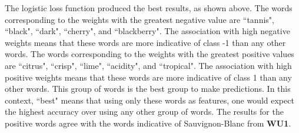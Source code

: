 \documentclass{article}
\begin{document}
\begin{enumerate}
\begin{enumerate}
	\end{enumerate}
	
The logistic loss function produced the best results, as shown above. The words corresponding to the weights with the greatest negative value are ``tannis", ``black", ``dark", ``cherry", and ``blackberry". The association with high negative weights means that these words are more indicative of class -1 than any other words. The words corresponding to the weights with the greatest positive values are ``citrus", ``crisp", ``lime", ``acidity", and ``tropical". The association with high positive weights means that these words are more indicative of class 1 than any other words. This group of words is the best group to make predictions. In this context, ``best" means that using only these words as features, one would expect the highest accuracy over using any other group of words. The results for the positive words agree with the words indicative of Sauvignon-Blanc from \textbf{WU1}.
	
	\end{enumerate}
\end{document}
